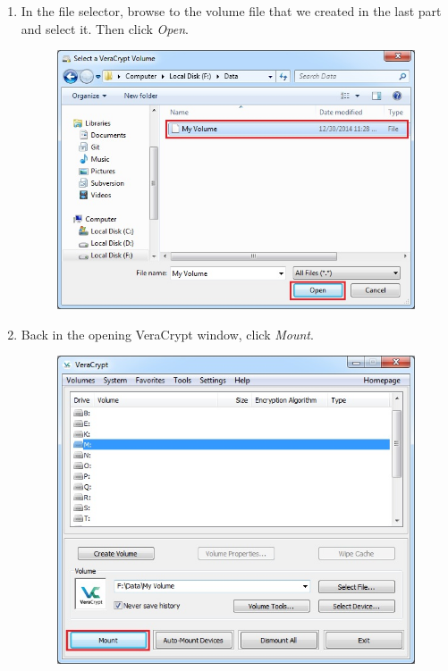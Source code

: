 \documentclass{tufte-handout}
\begin{document}
\begin{enumerate}
	\item In the file selector, browse to the volume file that we created in the last part and select it. Then click \textit{Open}.
	\begin{figure}%
		\includegraphics[width=.85\linewidth]{img/vc_mount_3.png}
	\end{figure}
	\FloatBarrier
	

	\item Back in the opening VeraCrypt window, click \textit{Mount}.
	\begin{figure}%
		\includegraphics[width=.85\linewidth]{img/vc_mount_4.png}
	\end{figure}
	\FloatBarrier
	
	\newpage
	

\end{enumerate}
\end{document}
